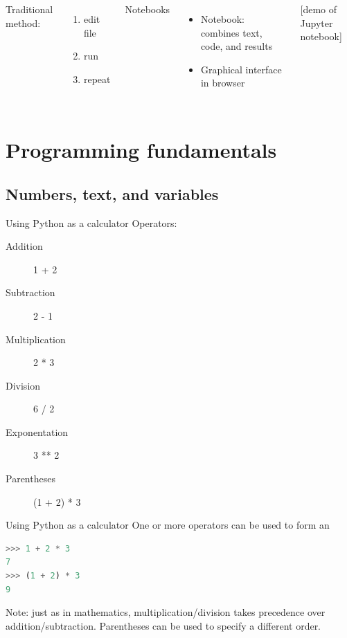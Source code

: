 \documentclass[aspectratio=169,usenames,dvipsnames]{beamer}
\begin{document}
\begin{frame}
	\begin{columns}
			Traditional method:
			\begin{enumerate}
				\item edit file
				\item run
				\item repeat
			\end{enumerate}
			Notebooks
			\begin{itemize}
				\item Notebook: combines text, code, and results
				\item Graphical interface in browser
			\end{itemize}
			[demo of Jupyter notebook]
	\end{columns}
\end{frame}



\section{Programming fundamentals}
\subsection{Numbers, text, and variables}
\frame{\tableofcontents[currentsection]}

\begin{frame}[fragile]{Using Python as a calculator}
Operators:
    \begin{description}
        \item[Addition] 1 + 2
        \item[Subtraction] 2 - 1
        \item[Multiplication] 2 * 3
        \item[Division] 6 / 2
        \item[Exponentation] 3 ** 2
        \item[Parentheses] (1 + 2) * 3
    \end{description}
\end{frame}

\begin{frame}[fragile]{Using Python as a calculator}
One or more operators can be used to form an 
\begin{lstlisting}[language=python]
>>> 1 + 2 * 3
7
>>> (1 + 2) * 3
9
\end{lstlisting}

\pause
Note: just as in mathematics, multiplication/division takes precedence over
    addition/subtraction. Parentheses can be used to specify a different order.
\end{frame}
\end{document}
